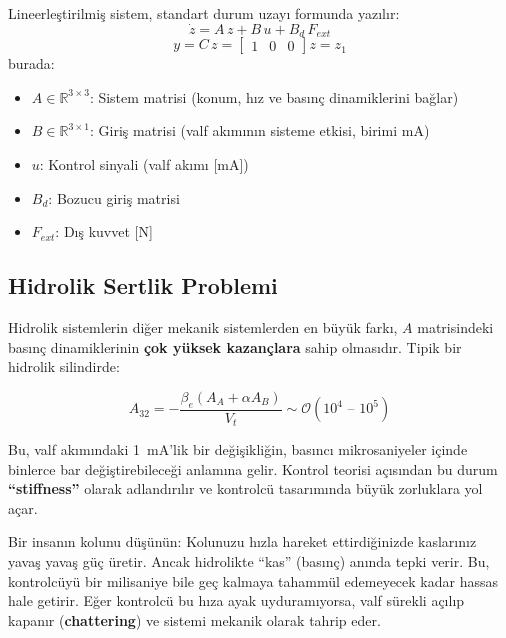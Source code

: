 \documentclass[12pt,a4paper]{article}
\begin{document}
\begin{kavram}
Lineerleştirilmiş sistem, standart durum uzayı formunda yazılır:
\begin{equation}
    \dot{z} = A\,z + B\,u + B_d\,F_{ext}
    \label{eq:plant}
\end{equation}
\begin{equation}
    y = C\,z = \begin{bmatrix} 1 & 0 & 0 \end{bmatrix} z = z_1
\end{equation}
burada:
\begin{itemize}
    \item $A \in \mathbb{R}^{3\times3}$: Sistem matrisi (konum, hız ve basınç dinamiklerini bağlar)
    \item $B \in \mathbb{R}^{3\times1}$: Giriş matrisi (valf akımının sisteme etkisi, birimi mA)
    \item $u$: Kontrol sinyali (valf akımı [mA])
    \item $B_d$: Bozucu giriş matrisi
    \item $F_{ext}$: Dış kuvvet [N]
\end{itemize}
\end{kavram}

\subsection{Hidrolik Sertlik Problemi}
\label{subsec:stiffness}

Hidrolik sistemlerin diğer mekanik sistemlerden en büyük farkı, $A$ matrisindeki basınç dinamiklerinin \textbf{çok yüksek kazançlara} sahip olmasıdır. Tipik bir hidrolik silindirde:

\begin{equation}
    A_{32} = -\frac{\beta_e (A_A + \alpha A_B)}{V_t} \sim \mathcal{O}(10^4 \text{ -- } 10^5)
\end{equation}

Bu, valf akımındaki 1~mA'lik bir değişikliğin, basıncı mikrosaniyeler içinde binlerce bar değiştirebileceği anlamına gelir. Kontrol teorisi açısından bu durum \textbf{``stiffness''} olarak adlandırılır ve kontrolcü tasarımında büyük zorluklara yol açar.

\begin{dikkat}
Bir insanın kolunu düşünün: Kolunuzu hızla hareket ettirdiğinizde kaslarınız yavaş yavaş güç üretir. Ancak hidrolikte ``kas'' (basınç) anında tepki verir. Bu, kontrolcüyü bir milisaniye bile geç kalmaya tahammül edemeyecek kadar hassas hale getirir. Eğer kontrolcü bu hıza ayak uyduramıyorsa, valf sürekli açılıp kapanır (\textbf{chattering}) ve sistemi mekanik olarak tahrip eder.
\end{dikkat}
\end{document}
